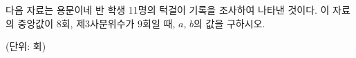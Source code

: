 다음 자료는 용문이네 반 학생 11명의 턱걸이 기록을 조사하여 나타낸 것이다. 이 자료의 중앙값이 8회, 제3사분위수가 9회일 때, $a$, $b$의 값을 구하시오. \par{\raggedleft\small (단위: 회)\par}
